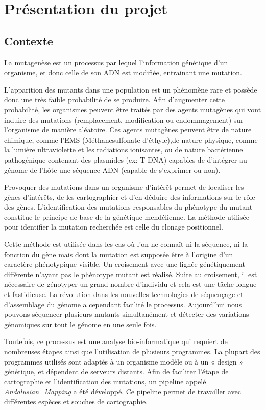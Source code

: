 \documentclass[12pt]{article}
\begin{document}
\newpage

\section{Présentation du projet}
\subsection{Contexte}

La mutagenèse est un processus par lequel l'information génétique d'un organisme, et donc celle de son ADN est modifiée, entrainant une mutation.

L'apparition des mutants dans une population est un phénomène rare et possède donc une très faible probabilité de se produire. Afin d'augmenter cette probabilité, les organismes peuvent être traités par des agents mutagènes qui vont induire des mutations (remplacement, modification ou endommagement) sur l'organisme de manière aléatoire. Ces agents mutagènes peuvent être de nature chimique, comme l'EMS (Méthanesulfonate d'éthyle),de nature physique, comme la lumière ultraviolette et les radiations ionisantes, ou de nature bactérienne pathogénique contenant des plasmides (ex: T DNA) capables de d’intégrer au génome de l'hôte une séquence ADN (capable de s'exprimer ou non). 

Provoquer des mutations dans un organisme d’intérêt permet de localiser les gènes d’intérêts, de les cartographier et d'en déduire des informations sur le rôle des gènes. L'identification des mutations responsables du phénotype du mutant constitue le principe de base de la génétique mendélienne. La méthode utilisée pour identifier la mutation recherchée est celle du clonage positionnel.

Cette méthode est utilisée dans les cas où l'on ne connaît ni la séquence, ni la fonction du gène mais dont la mutation est supposée être à l'origine d'un caractère phénotypique visible. Un croisement avec une lignée génétiquement différente n'ayant pas le phénotype mutant est réalisé. Suite au croisement, il est nécessaire de génotyper un grand nombre d'individu et cela est une tâche longue et fastidieuse. La révolution dans les nouvelles technologies de séquençage et d'assemblage du génome a cependant facilité le processus. Aujourd'hui nous pouvons séquencer plusieurs mutants simultanément et détecter des variations génomiques sur tout le génome en une seule fois.

Toutefois, ce processus est une analyse bio-informatique qui requiert de nombreuses étapes ainsi que l'utilisation de plusieurs programmes. La plupart des programmes utilisés sont adaptés à un organisme modèle ou à un « design » génétique, et dépendent de serveurs distants. Afin de faciliter l'étape de cartographie et l'identification des mutations, un pipeline appelé \textit{Andalusian\_Mapping} a été développé. Ce pipeline permet de travailler avec différentes espèces et souches de cartographie.
\end{document}
